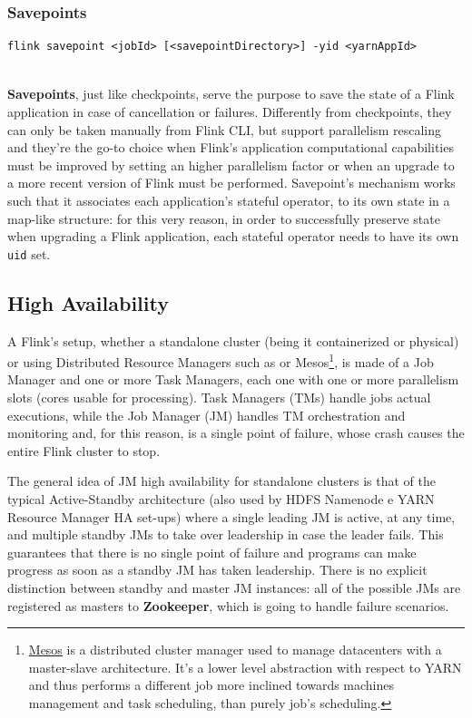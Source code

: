 \subsubsection{Savepoints}

\begin{code}
    \label{code:savepoint}
    \begin{verbatim}
flink savepoint <jobId> [<savepointDirectory>] -yid <yarnAppId> 
    \end{verbatim}
\end{code}~\\

\textbf{Savepoints}, just like checkpoints, serve the purpose to save the state of a Flink application in case of cancellation or failures. Differently from checkpoints, they can only be taken manually from Flink CLI, but support parallelism rescaling and they're the go-to choice when Flink's application computational capabilities must be improved by setting an higher parallelism factor or when an upgrade to a more recent version of Flink must be performed. Savepoint's mechanism works such that it associates each application's stateful operator, to its own state in a map-like structure: for this very reason, in order to successfully preserve state when upgrading a Flink application, each stateful operator needs to have its own \texttt{uid} set.

\subsection{High Availability}

A Flink's setup, whether a standalone cluster (being it containerized or physical) or using Distributed Resource Managers such as  or Mesos\footnote{\href{https://mesos.apache.org/}{Mesos} is a distributed cluster manager used to manage datacenters with a master-slave architecture. It's a lower level abstraction with respect to YARN and thus performs a different job more inclined towards machines management and task scheduling, than purely job's scheduling.}, is made of a Job Manager and one or more Task Managers, each one with one or more parallelism slots (cores usable for processing). Task Managers (TMs) handle jobs actual executions, while the Job Manager (JM) handles TM orchestration and monitoring and, for this reason, is a single point of failure, whose crash causes the entire Flink cluster to stop.

The general idea of JM high availability for standalone clusters is that of the typical Active-Standby architecture (also used by HDFS Namenode e YARN Resource Manager HA set-ups) where a single leading JM is active, at any time, and multiple standby JMs to take over leadership in case the leader fails. This guarantees that there is no single point of failure and programs can make progress as soon as a standby JM has taken leadership. There is no explicit distinction between standby and master JM instances: all of the possible JMs are registered as masters to \textbf{Zookeeper}, which is going to handle failure scenarios.

